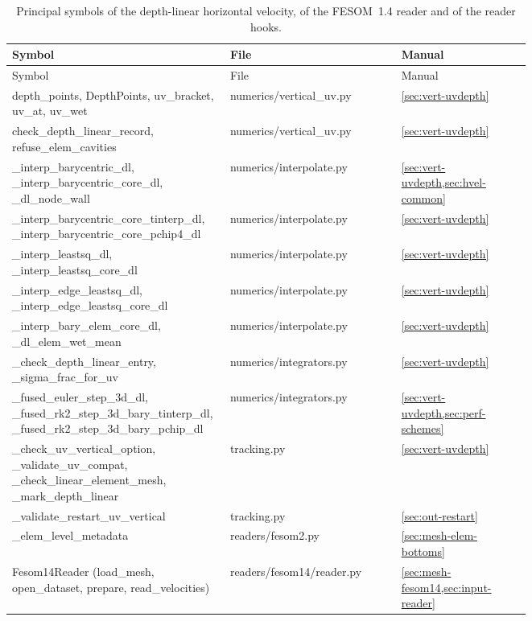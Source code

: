 \begin{longtable}{@{}>{\ttfamily\footnotesize\raggedright\arraybackslash}p{0.42\linewidth} >{\ttfamily\footnotesize\raggedright\arraybackslash}p{0.33\linewidth} >{\footnotesize}l@{}}
\caption{Principal symbols of the depth-linear horizontal velocity, of the FESOM~1.4 reader and of the reader hooks.}\label{tab:codemap-dl}\\
\toprule
\normalfont Symbol & \normalfont File & \normalfont Manual \\
\midrule \endfirsthead
\toprule
\normalfont Symbol & \normalfont File & \normalfont Manual \\
\midrule \endhead
depth\_points, DepthPoints, uv\_bracket, uv\_at, uv\_wet & numerics/vertical\_uv.py & \cref{sec:vert-uvdepth} \\
check\_depth\_linear\_record, refuse\_elem\_cavities & numerics/vertical\_uv.py & \cref{sec:vert-uvdepth} \\
\_interp\_barycentric\_dl, \_interp\_barycentric\_core\_dl, \_dl\_node\_wall & numerics/interpolate.py & \cref{sec:vert-uvdepth,sec:hvel-common} \\
\_interp\_barycentric\_core\_tinterp\_dl, \_interp\_barycentric\_core\_pchip4\_dl & numerics/interpolate.py & \cref{sec:vert-uvdepth} \\
\_interp\_leastsq\_dl, \_interp\_leastsq\_core\_dl & numerics/interpolate.py & \cref{sec:vert-uvdepth} \\
\_interp\_edge\_leastsq\_dl, \_interp\_edge\_leastsq\_core\_dl & numerics/interpolate.py & \cref{sec:vert-uvdepth} \\
\_interp\_bary\_elem\_core\_dl, \_dl\_elem\_wet\_mean & numerics/interpolate.py & \cref{sec:vert-uvdepth} \\
\_check\_depth\_linear\_entry, \_sigma\_frac\_for\_uv & numerics/integrators.py & \cref{sec:vert-uvdepth} \\
\_fused\_euler\_step\_3d\_dl, \_fused\_rk2\_step\_3d\_bary\_tinterp\_dl, \_fused\_rk2\_step\_3d\_bary\_pchip\_dl & numerics/integrators.py & \cref{sec:vert-uvdepth,sec:perf-schemes} \\
\_check\_uv\_vertical\_option, \_validate\_uv\_compat, \_check\_linear\_element\_mesh, \_mark\_depth\_linear & tracking.py & \cref{sec:vert-uvdepth} \\
\_validate\_restart\_uv\_vertical & tracking.py & \cref{sec:out-restart} \\
\_elem\_level\_metadata & readers/fesom2.py & \cref{sec:mesh-elem-bottoms} \\
Fesom14Reader (load\_mesh, open\_dataset, prepare, read\_velocities) & readers/fesom14/reader.py & \cref{sec:mesh-fesom14,sec:input-reader} \\

\end{longtable}
